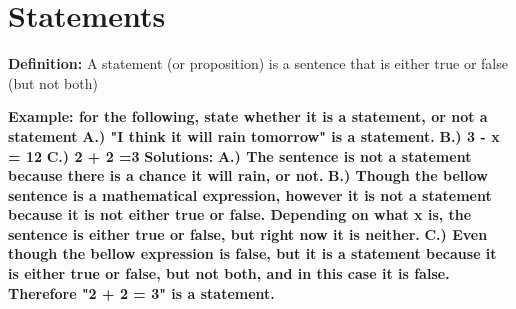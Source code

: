 \documentclass{report}
\begin{document}
    \section{Statements}
    \bigbreak \noindent 
    \begin{mdframed}
        \textbf{Definition:}
        A statement (or proposition) is a sentence that is either true or false (but not both)
    \end{mdframed}
    \bigbreak \noindent 
    \begin{mdframed}
      \textbf{Example: for the following, state whether it is a statement, or not a statement}
      \bigbreak \noindent 
      \textbf{A.) "I think it will rain tomorrow" is a statement.}
      \bigbreak \noindent 
      \textbf{B.) 3 - x = 12 }
      \bigbreak \noindent 
      \textbf{C.) 2 + 2 =3 }
      \bigbreak \noindent 
      \textbf{Solutions:}
      \bigbreak \noindent 
      \textbf{A.) The sentence is not a statement because there is a chance it will rain, or not.}
      \bigbreak \noindent 
      \textbf{B.) Though the bellow sentence is a mathematical expression, however it is not a statement because it is not either true or false. Depending on what x is, the sentence is either true or false, but right now it is neither.}
      \bigbreak \noindent 
      \textbf{C.) Even though the bellow expression is false, but it is a statement because it is either true or false, but not both, and in this case it is false. Therefore "2 + 2 = 3" is a statement.}
    \end{mdframed}

    \bigbreak \noindent \bigbreak \noindent 
\end{document}
